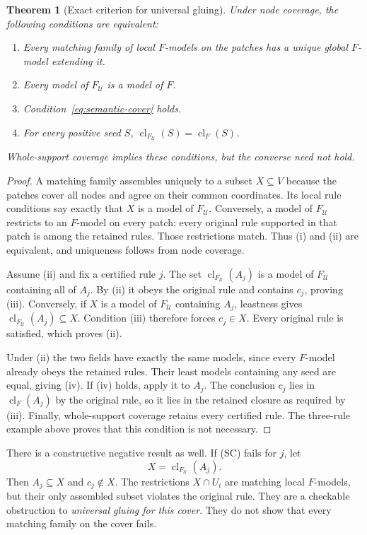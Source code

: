 \documentclass[11pt,oneside]{article}
\theoremstyle{komorebiplain}
\newtheorem{theorem}{Theorem}[section]
\theoremstyle{komorebidefinition}
\theoremstyle{komorebiremark}
\begin{document}
\begin{theorem}[Exact criterion for universal gluing]
\label{res:new:semantic-cover}
Under node coverage, the following conditions are equivalent:
\begin{enumerate}[label=(\roman*)]
\item Every matching family of local $F$-models on the patches has a unique global $F$-model extending it.
\item Every model of $F_{\mathcal U}$ is a model of $F$.
\item Condition~\eqref{eq:semantic-cover} holds.
\item For every positive seed $S$, $\operatorname{cl}_{F_{\mathcal U}}(S)=\operatorname{cl}_F(S)$.
\end{enumerate}
Whole-support coverage implies these conditions, but the converse need not hold.
\end{theorem}
\begin{proof}
A matching family assembles uniquely to a subset $X\subseteq V$ because the patches cover all nodes and agree on their common coordinates. Its local rule conditions say exactly that $X$ is a model of $F_{\mathcal U}$. Conversely, a model of $F_{\mathcal U}$ restricts to an $F$-model on every patch: every original rule supported in that patch is among the retained rules. Those restrictions match. Thus (i) and (ii) are equivalent, and uniqueness follows from node coverage.

Assume (ii) and fix a certified rule $j$. The set $\operatorname{cl}_{F_{\mathcal U}}(A_j)$ is a model of $F_{\mathcal U}$ containing all of $A_j$. By (ii) it obeys the original rule and contains $c_j$, proving (iii). Conversely, if $X$ is a model of $F_{\mathcal U}$ containing $A_j$, leastness gives $\operatorname{cl}_{F_{\mathcal U}}(A_j)\subseteq X$. Condition (iii) therefore forces $c_j\in X$. Every original rule is satisfied, which proves (ii).

Under (ii) the two fields have exactly the same models, since every $F$-model already obeys the retained rules. Their least models containing any seed are equal, giving (iv). If (iv) holds, apply it to $A_j$. The conclusion $c_j$ lies in $\operatorname{cl}_F(A_j)$ by the original rule, so it lies in the retained closure as required by (iii). Finally, whole-support coverage retains every certified rule. The three-rule example above proves that this condition is not necessary.
\end{proof}

There is a constructive negative result as well. If (SC) fails for $j$, let
\[
 X=\operatorname{cl}_{F_{\mathcal U}}(A_j).
\]
Then $A_j\subseteq X$ and $c_j\notin X$. The restrictions $X\cap U_i$ are matching local $F$-models, but their only assembled subset violates the original rule. They are a checkable obstruction to \emph{universal gluing for this cover}. They do not show that every matching family on the cover fails.
\end{document}
